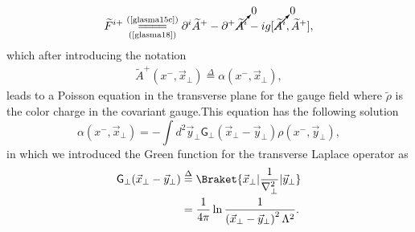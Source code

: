 \begin{equation}\label{glasma19}
    \widetilde{F}^{i+}\underset{(\text{\cref{glasma18}})}{\stackrel{(\text{\cref{glasma15c}})}{=\joinrel=\joinrel=\joinrel=}}\partial^i\widetilde{A}^+-\partial^+\cancelto{0}{\widetilde{A}^i}-ig[\cancelto{0}{\widetilde{A}^i},\widetilde{A}^+],
\end{equation}
which after introducing the notation
\begin{align*}
    \widetilde{A}^+(x^-,\vec{x}_\perp)\overset{\Delta}{=}\alpha(x^-,\vec{x}_\perp),
\end{align*}
leads to a Poisson equation in the transverse plane for the gauge field
where $\widetilde{\rho}$ is the color charge in the covariant gauge.This equation has the following solution
\begin{equation*}
    \alpha(x^-,\vec{x}_\perp)=-\int d^2\vec{y}_\perp\textsf{G}_\perp(\vec{x}_\perp-\vec{y}_\perp)\rho(x^-,\vec{y}_\perp),
\end{equation*}
in which we introduced the Green function for the transverse Laplace operator as
\begin{equation}\label{glasma21}
    \begin{aligned}
    \textsf{G}_\perp(\vec{x}_\perp-\vec{y}_\perp)&\overset{\Delta}{=}\Braket{\vec{x}_\perp|\frac{1}{\nabla^2_\perp}|\vec{y}_\perp}\\
    &=\frac{1}{4\pi}\ln{\frac{1}{\left(\vec{x}_\perp-\vec{y}_\perp\right)^2\Lambda^2}}.
    \end{aligned}
\end{equation}

